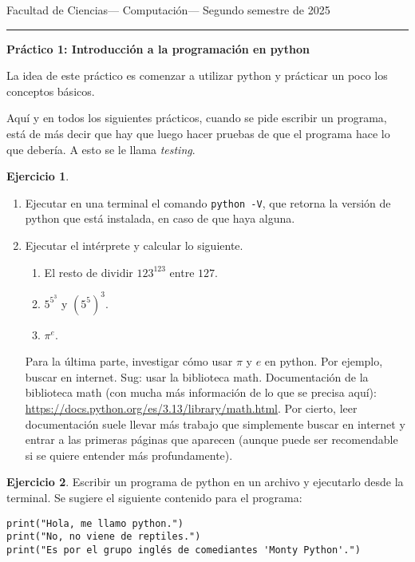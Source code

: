 \documentclass[a4paper,12pt]{book}
\theoremstyle{definition}
\newtheorem{ejercicio}{Ejercicio}
\begin{document}
	
	\noindent
	\centerline{\sc
		Facultad de Ciencias\hfill---\hfill
		Computación\hfill---\hfill
		Segundo semestre de 2025}\smallbreak\hrule
	
	\bigbreak
	\centerline{\Large\textbf{Práctico 1: Introducción a la programación en python}}
	\bigbreak
	
	La idea de este práctico es comenzar a utilizar python y prácticar un poco los conceptos básicos.
	
	Aquí y en todos los siguientes prácticos, cuando se pide escribir un programa, está de más decir que hay que luego hacer pruebas de que el programa hace lo que debería. A esto se le llama {\sl testing}.
	
	\begin{ejercicio}
		\begin{enumerate}
			\item Ejecutar en una terminal el comando {\tt python -V}, que retorna la versión de python que está instalada, en caso de que haya alguna.
			\item Ejecutar el intérprete y calcular lo siguiente.
			\begin{enumerate}\parskip-.5ex
				\item El resto de dividir $123^{123}$ entre $127$.
				\item $5^{5^3}$ y $(5^5)^3$.
				\item $\pi^e$.
			\end{enumerate}
			Para la última parte, investigar cómo usar $\pi$ y $e$ en python. Por ejemplo, buscar en internet. Sug: usar la biblioteca math. Documentación de la biblioteca math (con mucha más información de lo que se precisa aquí): \href{https://docs.python.org/es/3.13/library/math.html}{https://docs.python.org/es/3.13/library/math.html}. Por cierto, leer documentación suele llevar más trabajo que simplemente buscar en internet y entrar a las primeras páginas que aparecen (aunque puede ser recomendable si se quiere entender más profundamente).
		\end{enumerate}
		
		
	\end{ejercicio}
	\begin{ejercicio}
		Escribir un programa de python en un archivo y ejecutarlo desde la terminal. Se sugiere el siguiente contenido para el programa:
		\begin{verbatim}
print("Hola, me llamo python.")
print("No, no viene de reptiles.")
print("Es por el grupo inglés de comediantes 'Monty Python'.")
		\end{verbatim}
	\end{ejercicio}
	
\end{document}
